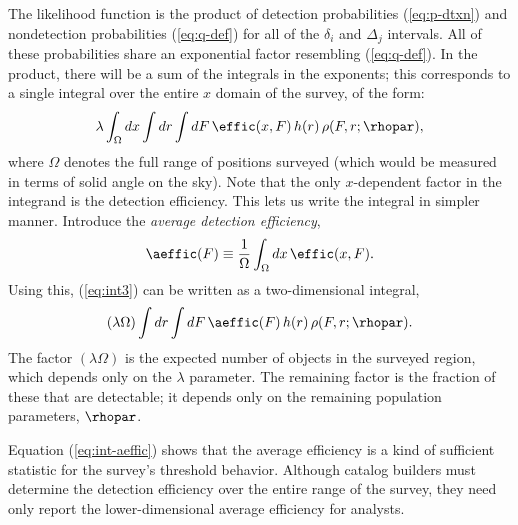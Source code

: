 The likelihood function is the product of detection probabilities (\ref{eq:p-dtxn}) and nondetection probabilities (\ref{eq:q-def}) for all of the $\delta_i$ and $\Delta_j$ intervals.
All of these probabilities share an exponential factor resembling (\ref{eq:q-def}).
In the product, there will be a sum of the integrals in the exponents; this corresponds to a single integral over the entire $x$ domain of the survey, of the form:
\begin{equation}\label{eq:int3}
\lambda\int_\Omega dx \int dr \int dF\,\effic(x,F)\, h(r)\, \rho(F,r;\rhopar),
\end{equation}
where $\Omega$ denotes the full range of positions surveyed (which would be measured in terms of solid angle on the sky).
Note that the only $x$-dependent factor in the integrand is the detection efficiency.
This lets us write the integral in simpler manner.
Introduce the \emph{average detection efficiency},
\begin{equation}\label{eq:aeffic}
\aeffic(F) \equiv \frac{1}{\Omega} \int_\Omega dx \,\effic(x,F).
\end{equation}
Using this, (\ref{eq:int3}) can be written as a two-dimensional integral,
\begin{equation}\label{eq:int-aeffic}
(\lambda \Omega) \int dr \int dF\,\aeffic(F)\, h(r)\, \rho(F,r;\rhopar).
\end{equation}
The factor $(\lambda \Omega)$ is the expected number of objects in the surveyed region, which depends only on the $\lambda$ parameter.
The remaining factor is the fraction of these that are detectable; it depends only on the remaining population parameters, $\rhopar$.

Equation (\ref{eq:int-aeffic}) shows that the average efficiency is a kind of sufficient statistic for the survey's threshold behavior.
Although catalog builders must determine the detection efficiency over the entire range of the survey, they need only report the lower-dimensional average efficiency for analysts.

